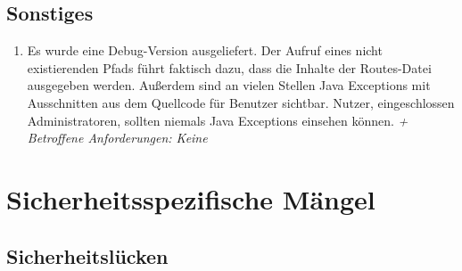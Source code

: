 \documentclass[12pt,DIV14,BCOR10mm,a4paper,parskip=half-,headsepline,headinclude,english,ngerman,bibliography=totocnumbered]{scrreprt}
\begin{document}
\section{Sonstiges}

\begin{enumerate}[resume]




  \item Es wurde eine Debug-Version ausgeliefert. Der Aufruf eines nicht existierenden Pfads führt faktisch dazu, dass die Inhalte der Routes-Datei ausgegeben werden. Außerdem sind an vielen Stellen Java Exceptions mit Ausschnitten aus dem Quellcode für Benutzer sichtbar. Nutzer, eingeschlossen Administratoren, sollten niemals Java Exceptions einsehen können.\newline
  \textit{+ Betroffene Anforderungen: Keine}


\end{enumerate}

\chapter{Sicherheitsspezifische Mängel}

\section{Sicherheitslücken}
\end{document}
